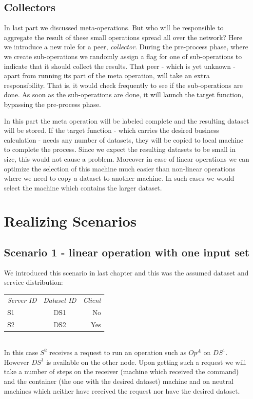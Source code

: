 \subsection{Collectors}
In last part we discussed meta-operations. 
But who will be responsible to aggregate the result of these small operations spread all over the network? 
Here we introduce a new role for a peer, \textit{collector}. 
During the pre-process phase, where we create sub-operations we randomly assign
a flag for one of sub-operations to indicate that it should collect the results. 
That peer - which is yet unknown - apart from running its part of the meta operation,
will take an extra responsibility. That is, it would check frequently to see if the
sub-operations are done. As soon as the sub-operations are done, it will
launch the target function, bypassing the pre-process phase.

In this part the meta operation will be labeled complete and the resulting dataset will be stored.
If the target function - which carries the desired business calculation - needs any number of datasets,
they will be copied to local machine to complete the process. 
Since we expect the resulting datasets to be small in size, this would not cause a problem. 
Moreover in case of linear operations we can optimize the selection of this machine much easier than
non-linear operations where we need to copy a dataset to another machine. 
In such cases we would select the machine which contains the larger dataset.


\section{Realizing Scenarios}
\subsection{Scenario 1 - linear operation with one input set}
We introduced this scenario in last chapter and this was the assumed dataset and service distribution:

\begin{tabular}{ l c r }
\em{Server ID} & \em{ Dataset ID} & \em{ Client} \\
S1 & DS1 & No \\
S2 & DS2 & Yes \\
\end{tabular}\\

In this case \(S^2\) receives a request to run an operation such as \(Op^A\) on \(DS^1\).
However \(DS^1\) is available on the other node.
Upon getting such a request we will take a number of steps on the receiver (machine which received the command)
and the container (the one with the desired dataset) machine and on neutral machines which neither have received the
request nor have the desired dataset.

